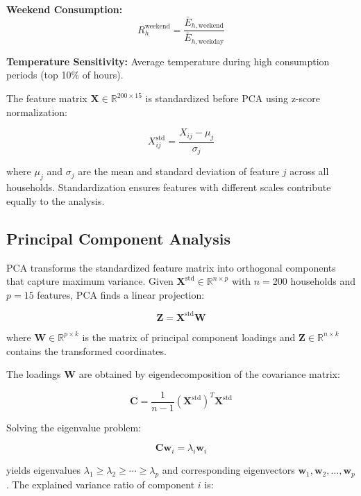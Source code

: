 \documentclass[11pt]{article}
\begin{document}
\textbf{Weekend Consumption:}
\begin{equation}
R_h^{\text{weekend}} = \frac{\bar{E}_{h,\text{weekend}}}{\bar{E}_{h,\text{weekday}}}
\end{equation}

\textbf{Temperature Sensitivity:}
Average temperature during high consumption periods (top 10\% of hours).

The feature matrix $\mathbf{X} \in \mathbb{R}^{200 \times 15}$ is standardized before PCA using z-score normalization:

\begin{equation}
X_{ij}^{\text{std}} = \frac{X_{ij} - \mu_j}{\sigma_j}
\end{equation}

where $\mu_j$ and $\sigma_j$ are the mean and standard deviation of feature $j$ across all households. Standardization ensures features with different scales contribute equally to the analysis.

\subsection{Principal Component Analysis}

PCA transforms the standardized feature matrix into orthogonal components that capture maximum variance. Given $\mathbf{X}^{\text{std}} \in \mathbb{R}^{n \times p}$ with $n=200$ households and $p=15$ features, PCA finds a linear projection:

\begin{equation}
\mathbf{Z} = \mathbf{X}^{\text{std}} \mathbf{W}
\end{equation}

where $\mathbf{W} \in \mathbb{R}^{p \times k}$ is the matrix of principal component loadings and $\mathbf{Z} \in \mathbb{R}^{n \times k}$ contains the transformed coordinates.

The loadings $\mathbf{W}$ are obtained by eigendecomposition of the covariance matrix:

\begin{equation}
\mathbf{C} = \frac{1}{n-1} (\mathbf{X}^{\text{std}})^T \mathbf{X}^{\text{std}}
\end{equation}

Solving the eigenvalue problem:

\begin{equation}
\mathbf{C} \mathbf{w}_i = \lambda_i \mathbf{w}_i
\end{equation}

yields eigenvalues $\lambda_1 \geq \lambda_2 \geq \cdots \geq \lambda_p$ and corresponding eigenvectors $\mathbf{w}_1, \mathbf{w}_2, \ldots, \mathbf{w}_p$. The explained variance ratio of component $i$ is:
\end{document}
